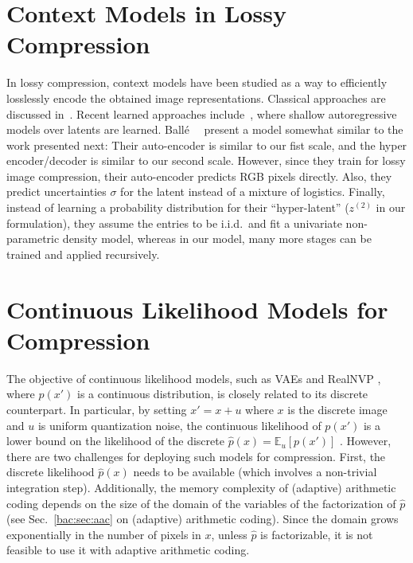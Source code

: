 \section{Context Models in Lossy Compression} In lossy compression, context
models have been studied as a way to efficiently losslessly encode the obtained
image representations. Classical approaches are discussed
in~\cite{marpe2003context,context2,context4,context3,context1}. Recent learned
approaches include~\cite{li2017learning, mentzer2018conditional, minnen2018joint},
where shallow autoregressive models over latents are learned.
Ballé \etal~\cite{balle2018variational}~present a model somewhat similar to the
work presented next: Their auto-encoder is similar to our fist scale, and the
hyper encoder/decoder is similar to our second scale. However, since they train
for lossy image compression, their auto-encoder predicts RGB pixels directly.
Also, they predict uncertainties $\sigma$ for the latent instead of a
mixture of logistics.  Finally, instead of learning a probability distribution
for their ``hyper-latent'' ($z^{(2)}$ in our formulation), they assume the
entries to be i.i.d.\ and fit a univariate non-parametric density model,
whereas in our model, many more stages can be trained and applied
recursively.

\section{Continuous Likelihood Models for Compression}

The objective of continuous likelihood models, such as VAEs
\cite{kingma2013auto} and RealNVP \cite{dinh2016density}, where $p(x')$ is a
continuous distribution, is closely related to its discrete counterpart. In
particular, by setting $x'=x+u$ where $x$ is the discrete image and $u$ is
uniform quantization noise, the continuous likelihood of $p(x')$  is a lower
bound on the likelihood of the discrete $\hat p(x)= \mathbb E_u[p(x')]$
\cite{theis2016note}. However, there are two challenges for deploying such
models for compression. First, the discrete likelihood $\hat p(x)$ needs to be
available (which involves a non-trivial integration step). Additionally, the
memory complexity of (adaptive) arithmetic coding depends on the size of the
domain of the variables of the factorization of $\hat p$ (see
Sec.~\ref{bac:sec:aac} on (adaptive) arithmetic coding). Since the
domain grows exponentially in the number of pixels in $x$, unless $\hat p$ is
factorizable, it is not feasible to use it with adaptive arithmetic coding.

